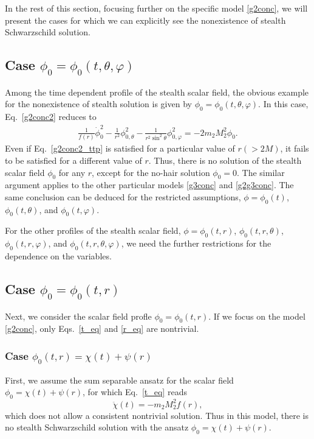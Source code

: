 \documentclass[prd,amsmath,amssymb,floatfix,superscriptaddress,notitlepage,nofootinbib,preprintnumbers]{revtex4-1}
\newcommand{\be}{\begin{equation}}
\newcommand{\ee}{\end{equation}}
\begin{document}
In the rest of this section, focusing further on the specific model \eqref{g2conc},
we will present the cases
for which we can explicitly see the nonexistence of stealth Schwarzschild solution.


\subsection{Case $\phi_0=\phi_0(t,\theta,\varphi)$}
\label{sec51}

Among the time dependent profile of the stealth scalar field,
the obvious example for the nonexistence of stealth solution is given by
$\phi_0=\phi_0(t,\theta,\varphi)$.
In this case, Eq.~\eqref{g2conc2} reduces to 
\begin{align}
\label{g2conc2_ttp}
\frac{1}{f(r)}\dot{\phi}_0^2
      -\frac{1}{r^2}\phi_{0,\theta}^2
      -\frac{1}{r^2\sin^2\theta} \phi_{0,\varphi}^2
=-2m_2 M_2^2\phi_0.
\end{align}
Even if Eq.~\eqref{g2conc2_ttp} is satisfied for a particular value of $r(>2M)$,
it fails to be satisfied for a different value of $r$.
Thus, there is no solution of the stealth scalar field $\phi_0$
for any $r$, except for the no-hair solution $\phi_0=0$.
The similar argument
applies to the other particular models \eqref{g3conc} and \eqref{g2g3conc}.
The same conclusion can be deduced 
for the restricted assumptions,
$\phi=\phi_0(t)$, $\phi_0(t,\theta)$, and $\phi_0(t,\varphi)$.


For the other profiles of the stealth scalar field,
$\phi=\phi_0(t,r)$,
$\phi_0(t,r,\theta)$,
$\phi_0(t,r,\varphi)$,
and 
$\phi_0(t,r,\theta,\varphi)$,
we need the further restrictions 
for the dependence on the variables.


\subsection{Case $\phi_0=\phi_0(t,r)$}
\label{sec52}


Next, we consider the scalar field profle $\phi_0=\phi_0(t,r)$.
If we focus on the model \eqref{g2conc},
only Eqs.~\eqref{t_eq} and \eqref{r_eq} are nontrivial.


\subsubsection{Case $\phi_0(t,r)= \chi(t)+\psi(r)$} 
\label{sec521}


First, we assume the sum separable ansatz for the scalar field $\phi_0=\chi(t)+\psi(r)$,
for which Eq.~\eqref{t_eq} reads
\be \ddot{\chi}(t)=-m_2M_2^2 f(r), \ee
which does not allow a consistent nontrivial solution.
Thus in this model,
there is no stealth Schwarzschild solution 
with the ansatz $\phi_0= \chi(t)+\psi(r)$.
\end{document}
